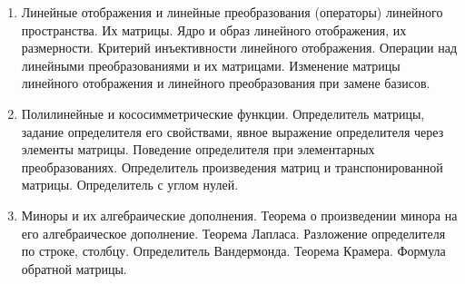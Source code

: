 \begin{enumerate}
    \item Линейные отображения и линейные преобразования (операторы) линейного пространства. Их матрицы. Ядро и образ линейного отображения, их размерности. Критерий инъективности линейного отображения. Операции над линейными преобразованиями и их матрицами. Изменение матрицы линейного отображения и линейного преобразования при замене базисов.
    \item Полилинейные и кососимметрические функции. Определитель матрицы, задание определителя его свойствами, явное выражение определителя через элементы матрицы. Поведение определителя при элементарных преобразованиях. Определитель произведения матриц и транспонированной матрицы. Определитель с углом нулей.
    \item Миноры и их алгебраические дополнения. Теорема о произведении минора на его алгебраическое дополнение. Теорема Лапласа. Разложение определителя по строке, столбцу. Определитель Вандермонда. Теорема Крамера. Формула обратной матрицы.
\end{enumerate}